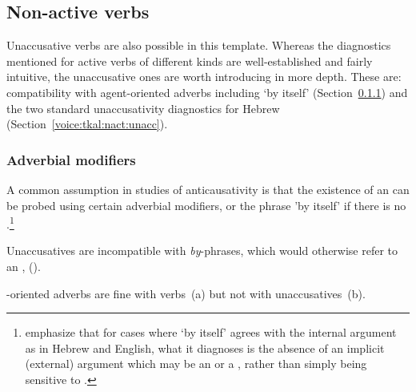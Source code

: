 \begin{exe}
\begin{xlist}
\begin{exe}
\begin{xlist}
\begin{exe}
\begin{xlist}
	
 \z
\z 

	\subsection{Non-active verbs} \label{voice:tkal:nact}
Unaccusative verbs are also possible in this template. Whereas the diagnostics mentioned for active verbs of different kinds are well-established and fairly intuitive, the unaccusative ones are worth introducing in more depth. These are: compatibility with agent-oriented adverbs including `by itself’ (Section~\ref{voice:tkal:nact:adv}) and the two standard unaccusativity diagnostics for Hebrew (Section~\ref{voice:tkal:nact:unacc}).

		\subsubsection{Adverbial modifiers} \label{voice:tkal:nact:adv}
A common assumption in studies of anticausativity is that the existence of an  can be probed using certain adverbial modifiers, or the phrase 'by itself' if there is no  \citep{unaccusativity95,alexiadouanagnostopoulou04,layering15,alexiadoudoron12,koontzgarboden09,kastner17gjgl}.\footnote{\cite{layering15} emphasize that for cases where `by itself' agrees with the internal argument as in Hebrew and English, what it diagnoses is the absence of an implicit (external) argument which may be an  or a , rather than simply being sensitive to .} 

Unaccusatives are incompatible with \emph{by}-phrases, which would otherwise refer to an , (\nextx).
 \begin{exe}
	
 \z 

-oriented adverbs are fine with  verbs~(\nextx a) but not with unaccusatives~(\nextx b).
 \begin{exe}
 \ex  
 \begin{xlist} 
		

\end{xlist}
\end{exe}
\end{exe}
\end{xlist}
\end{exe}
\end{xlist}
\end{exe}
\end{xlist}
\end{exe}
